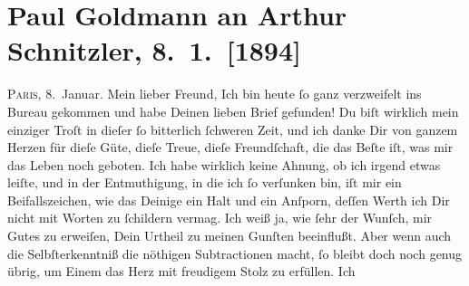 

         
         \renewcommand{\erwaehntePersonen}{Personen: Paul Goldmann, Felix Salten}
         \renewcommand{\erwaehnteInstitutionen}{Institutionen: Frankfurter Zeitung}
         \renewcommand{\erwaehnteOrte}{Orte: Paris, Wien, rue Richelieu}
         \renewcommand{\erwaehnteWerke}{Werke: Anatol}
               \section[Paul Goldmann an Arthur Schnitzler, 8. 1. {[}1894{]}]{ Paul Goldmann an Arthur Schnitzler, 8. 1. {[}1894{]}}\nopagebreak{}\rehead{ }\begin{ledgroupsized}[t]{13cm}\normalsize\beginnumbering{} \toendnotes[C]{\smallbreak\pagebreak[2]} 
\toendnotes[C]{\smallbreak}\pstart
           \raggedleft{}{\pb}\textsc{Paris,}{ }8. Januar.\pend
           \pstart\center{}Mein lieber Freund,\pend\pstart
           Ich bin heute ſo ganz verzweifelt ins Bureau gekommen und habe Deinen lieben Brief gefunden! Du
               biſt wirklich mein einziger Troſt in dieſer ſo bitterlich ſchweren Zeit, und ich
               danke Dir von ganzem Herzen für dieſe Güte, dieſe Treue, dieſe Freundſchaft, die das
               Beſte iſt, was mir das Leben noch geboten. Ich habe wirklich keine Ahnung, ob ich
               irgend etwas leiſte, und in der Entmuthigung, in die ich ſo verſunken bin, iſt mir
                  ein\strikeout{\textcolor{gray}{e}} Beifallszeichen, wie das Deinige ein Halt und {\pb}ein Anſporn, deſſen Werth ich Dir nicht mit Worten zu ſchildern vermag. Ich weiß
               ja, wie ſehr der Wunſch, mir Gutes zu erweiſen, Dein Urtheil zu meinen Gunſten
               beeinflußt. Aber wenn auch die Selbſterkenntniß die nöthigen Subtractionen macht, ſo
               bleibt doch noch genug übrig, um Einem das Herz mit freudigem Stolz zu erfüllen. Ich

\end{ledgroupsized}
